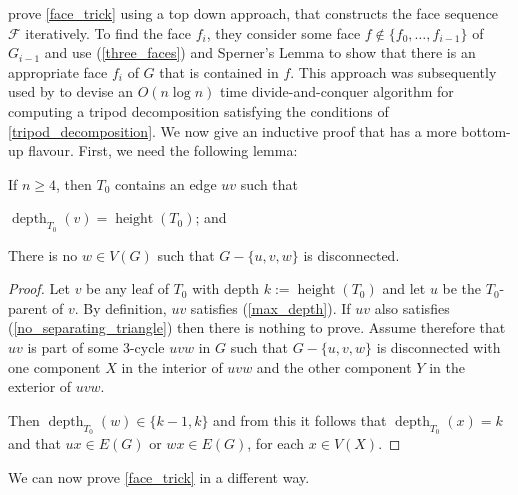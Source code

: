 \documentclass{patmorin}
\DeclareMathOperator{\height}{height}
\DeclareMathOperator{\depth}{depth}
\begin{document}
\citet{dujmovic.joret.ea:planar} prove \cref{face_trick} using a top down approach, that constructs the face sequence $\mathcal{F}$ iteratively.  To find the face $f_i$, they consider some face $f\not\in\{f_0,\ldots,f_{i-1}\}$ of $G_{i-1}$ and use (\ref{three_faces}) and Sperner's Lemma to show that there is an appropriate face $f_i$ of $G$ that is contained in $f$.  This approach was subsequently used by \citet{morin:fast} to devise an $O(n\log n)$ time divide-and-conquer algorithm for computing a tripod decomposition satisfying the conditions of \cref{tripod_decomposition}.  We now give an inductive proof that has a more bottom-up flavour.  First, we need the following lemma:

\begin{lem}\label{good_deep_edge}
  If $n\ge 4$, then $T_0$ contains an edge $uv$ such that
  \begin{compactenum}[(i)]
    \item\label{max_depth} $\depth_{T_0}(v)=\height(T_0)$; and
    \item\label{no_separating_triangle} There is no $w\in V(G)$ such that $G-\{u,v,w\}$ is disconnected.
  \end{compactenum}
\end{lem}

\begin{proof}
  Let $v$ be any leaf of $T_0$ with depth $k:=\height(T_0)$ and let $u$ be the $T_0$-parent of $v$.  By definition, $uv$ satisfies (\ref{max_depth}).  If $uv$ also satisfies (\ref{no_separating_triangle}) then there is nothing to prove.  Assume therefore that $uv$ is part of some $3$-cycle $uvw$ in $G$ such that $G-\{u,v,w\}$ is disconnected with one component $X$ in the interior of $uvw$ and the other component $Y$ in the exterior of $uvw$.

  Then $\depth_{T_0}(w)\in\{k-1,k\}$ and from this it follows that $\depth_{T_0}(x)=k$ and that $ux\in E(G)$ or $wx\in E(G)$, for each $x\in V(X)$.
\end{proof}

We can now prove \cref{face_trick} in a different way.
\end{document}
